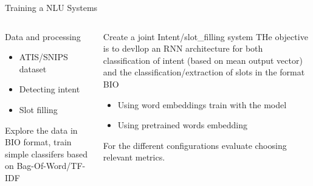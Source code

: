 \documentclass[10pt,aspectratio=169]{beamer}
\begin{document}
\begin{frame}{Training a NLU Systems}
    \begin{columns}
        \begin{column}{0.5\textwidth}
            \begin{block}{Data and processing}
                \begin{itemize}
                    \item ATIS/SNIPS dataset
                    \item Detecting intent 
                    \item Slot filling
                \end{itemize}
                Explore the data in BIO format, train simple classifers based on Bag-Of-Word/TF-IDF 
            \end{block}
        \end{column}
        \begin{column}{0.5\textwidth}
            \begin{block}{Create a joint Intent/slot_filling system}
            THe objective is to devllop an RNN architecture for both classification of intent (based on mean output vector) and the classification/extraction of slots in the format BIO
                \begin{itemize}
                    \item Using word embeddings train with the model
                    \item Using pretrained words embedding  
                \end{itemize}
                For the different configurations evaluate choosing relevant metrics.
            \end{block}
        \end{column}
    \end{columns}
\end{frame}

\end{document}
